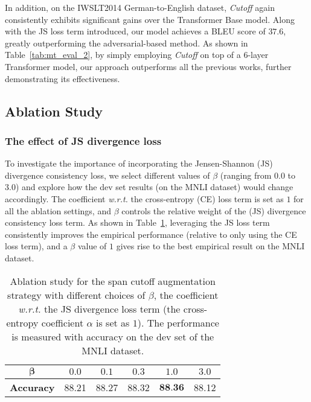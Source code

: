 \documentclass[11pt,a4paper]{article}
\newcommand{\tf}[1]{\textbf{#1}}
\begin{document}
In addition, on the IWSLT2014 German-to-English dataset, \emph{Cutoff} again consistently exhibits significant gains over the Transformer Base model. Along with the JS loss term introduced, our model achieves a BLEU score of $37.6$, greatly outperforming the adversarial-based method. As shown in Table~\ref{tab:mt_eval_2}, by simply employing \emph{Cutoff} on top of a $6$-layer Transformer model, our approach outperforms all the previous works, further demonstrating its effectiveness.
\vspace{-1mm}
\subsection{Ablation Study}
\vspace{-1mm}
\subsubsection{The effect of JS divergence loss}
To investigate the importance of incorporating the Jensen-Shannon (JS) divergence consistency loss, we select different values of $\beta$ (ranging from 0.0 to 3.0) and explore how the dev set results (on the MNLI dataset) would change accordingly. The coefficient \emph{w.r.t.} the cross-entropy (CE) loss term is set as $1$ for all the ablation settings, and $\beta$ controls the relative weight of the (JS) divergence consistency loss term. As shown in Table~\ref{tab:beta}, leveraging the JS loss term consistently improves the empirical performance (relative to only using the CE loss term), and a $\beta$ value of $1$ gives rise to the best empirical result on the MNLI dataset.
\begin{table} [ht!]
	\centering
\def\arraystretch{1.25}
	\footnotesize 
	\vspace{-1mm}
\begin{tabular}{c||c|c|c|c|c}
\toprule[1.2pt]
	    $\boldsymbol{\beta}$ & $0.0$ & $0.1$ & $0.3$ & $1.0$ & $3.0$  \\
		\hline
		\textbf{Accuracy} & 88.21 & 88.27  & 88.32  & $\tf{88.36}$  & 88.12  \\
		\bottomrule[1.2pt]
\end{tabular}
	\caption{Ablation study for the span cutoff augmentation strategy with different choices of $\beta$, the coefficient \emph{w.r.t.} the JS divergence loss term (the cross-entropy coefficient $\alpha$ is set as $1$). The performance is measured with accuracy on the dev set of the MNLI dataset.}
	\label{tab:beta}
\vspace{-2mm}
\end{table}
\vspace{-2mm}
\end{document}
